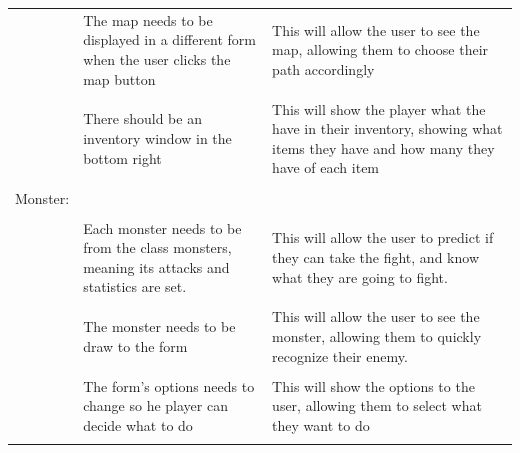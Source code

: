 \documentclass[12pt]{article}
\begin{document}
\begin{tabularx}{\linewidth}{XXX}
                        & The map needs to be displayed in a different form when the user clicks the map button              & This will allow the user to see the map, allowing them to choose their path accordingly                                                                                                                                                            \\\\
                        & There should be an inventory window in the bottom right                                            & This will show the player what the have in their inventory, showing what items they have and how many they have of each item                                                                                                                       \\\\
Monster:                &                                                                                                    &                                                                                                                                                                                                                                                    \\\\
                        & Each monster needs to be from the class monsters, meaning its attacks and statistics are set.      & This will allow the user to predict if they can take the fight, and know what they are going to fight.                                                                                                                                             \\\\
                        & The monster needs to be draw to the form                                                           & This will allow the user to see the monster, allowing them to quickly recognize their enemy.                                                                                                                                                       \\\\
                        & The form’s options needs to change so he player can decide what to do                              & This will show the options to the user, allowing them to select what they want to do                                                                                                                                                               \\\\

\end{tabularx}
\end{document}
